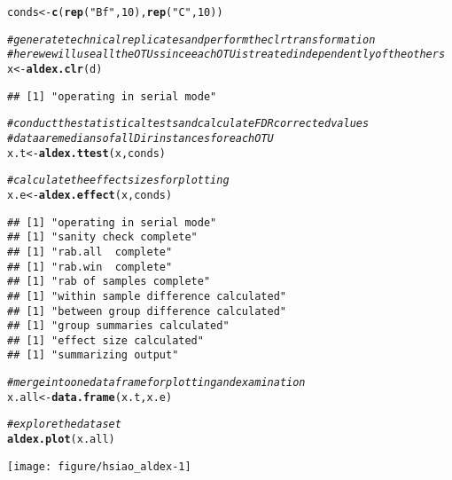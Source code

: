 \documentclass[11pt]{article}\usepackage[]{graphicx}\usepackage[]{color}
\makeatletter
\def\maxwidth{ %
  \ifdim\Gin@nat@width>\linewidth
    \linewidth
  \else
    \Gin@nat@width
  \fi
}
\newcommand{\hlnum}[1]{\textcolor[rgb]{0.686,0.059,0.569}{#1}}%
\newcommand{\hlstr}[1]{\textcolor[rgb]{0.192,0.494,0.8}{#1}}%
\newcommand{\hlcom}[1]{\textcolor[rgb]{0.678,0.584,0.686}{\textit{#1}}}%
\newcommand{\hlstd}[1]{\textcolor[rgb]{0.345,0.345,0.345}{#1}}%
\newcommand{\hlkwb}[1]{\textcolor[rgb]{0.69,0.353,0.396}{#1}}%
\newcommand{\hlkwd}[1]{\textcolor[rgb]{0.737,0.353,0.396}{\textbf{#1}}}%
\newenvironment{kframe}{%
 \def\at@end@of@kframe{}%
 \ifinner\ifhmode%
  \def\at@end@of@kframe{\end{minipage}}%
  \begin{minipage}{\columnwidth}%
 \fi\fi%
 \def\FrameCommand##1{\hskip\@totalleftmargin \hskip-\fboxsep
 \colorbox{shadecolor}{##1}\hskip-\fboxsep
     \hskip-\linewidth \hskip-\@totalleftmargin \hskip\columnwidth}%
 \MakeFramed {\advance\hsize-\width
   \@totalleftmargin\z@ \linewidth\hsize
   \@setminipage}}%
 {\par\unskip\endMakeFramed%
 \at@end@of@kframe}
\newenvironment{knitrout}{}{} %
\makeatother
\begin{document}
\begin{knitrout}
\color{fgcolor}\begin{kframe}
\begin{alltt}
\hlstd{conds} \hlkwb{<-} \hlkwd{c}\hlstd{(}\hlkwd{rep}\hlstd{(}\hlstr{"Bf"}\hlstd{,} \hlnum{10}\hlstd{),} \hlkwd{rep}\hlstd{(}\hlstr{"C"}\hlstd{,} \hlnum{10}\hlstd{))}

\hlcom{# generate technical replicates and perform the clr transformation}
\hlcom{# here we will use all the OTUs since each OTU is treated independently of the others}
\hlstd{x} \hlkwb{<-} \hlkwd{aldex.clr}\hlstd{(d)}
\end{alltt}
\begin{verbatim}
## [1] "operating in serial mode"
\end{verbatim}
\begin{alltt}
\hlcom{# conduct the statistical tests and calculate FDR corrected values}
\hlcom{# data are medians of all Dir instances for each OTU}
\hlstd{x.t} \hlkwb{<-} \hlkwd{aldex.ttest}\hlstd{(x, conds)}

\hlcom{# calculate the effect sizes for plotting}
\hlstd{x.e} \hlkwb{<-} \hlkwd{aldex.effect}\hlstd{(x, conds)}
\end{alltt}
\begin{verbatim}
## [1] "operating in serial mode"
## [1] "sanity check complete"
## [1] "rab.all  complete"
## [1] "rab.win  complete"
## [1] "rab of samples complete"
## [1] "within sample difference calculated"
## [1] "between group difference calculated"
## [1] "group summaries calculated"
## [1] "effect size calculated"
## [1] "summarizing output"
\end{verbatim}
\begin{alltt}
\hlcom{# merge into one data frame for plotting and examination}
\hlstd{x.all} \hlkwb{<-} \hlkwd{data.frame}\hlstd{(x.t, x.e)}

\hlcom{# explore the dataset}
\hlkwd{aldex.plot}\hlstd{(x.all)}
\end{alltt}
\end{kframe}
\texttt{[image: figure/hsiao\_aldex-1]} 

\end{knitrout}
\end{document}
